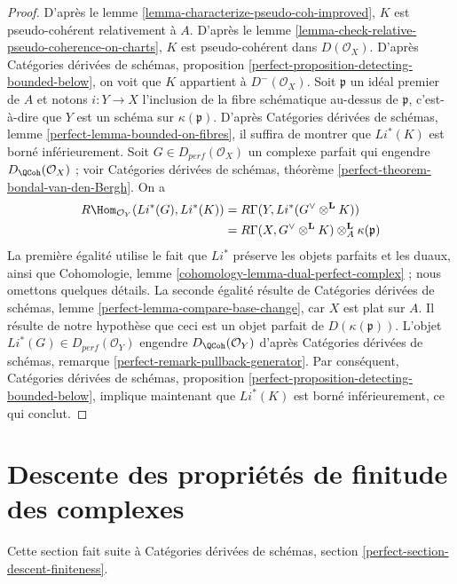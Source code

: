 \begin{proof}
D'après le lemme \ref{lemma-characterize-pseudo-coh-improved},
$K$ est pseudo-cohérent relativement à $A$. D'après le lemme
\ref{lemma-check-relative-pseudo-coherence-on-charts},
$K$ est pseudo-cohérent dans $D( \mathcal{O}_X)$.
D'après Catégories dérivées de schémas, proposition
\ref{perfect-proposition-detecting-bounded-below},
on voit que $K$ appartient à $D^-(\mathcal{O}_X)$.
Soit $\mathfrak{p}$ un idéal premier de $A$ et notons
$i : Y \to X$ l'inclusion de la fibre schématique
au-dessus de $\mathfrak{p}$, c'est-à-dire que $Y$ est un schéma sur $\kappa(\mathfrak p)$.
D'après Catégories dérivées de schémas, lemme \ref{perfect-lemma-bounded-on-fibres},
il suffira de montrer que $Li^*(K)$ est borné inférieurement.
Soit $G \in D_{perf} (\mathcal{O}_X)$ un complexe parfait
qui engendre $D_\QCoh (\mathcal{O}_X)$ ;
voir Catégories dérivées de schémas, théorème
\ref{perfect-theorem-bondal-van-den-Bergh}.
On a
\begin{align*}
R\Hom _{\mathcal{O}_Y}(Li^*(G), Li^*(K))
& =
R\Gamma(Y, Li^*(G ^\vee \otimes ^\mathbf{L} K)) \\
& =
R\Gamma(X, G^\vee \otimes ^{\mathbf{L}} K)
\otimes^\mathbf{L}_A \kappa(\mathfrak{p})
\end{align*}
La première égalité utilise le fait que $Li^*$ préserve les objets parfaits et les duaux,
ainsi que Cohomologie, lemme \ref{cohomology-lemma-dual-perfect-complex} ; nous omettons
quelques détails. La seconde égalité résulte de
Catégories dérivées de schémas, lemme
\ref{perfect-lemma-compare-base-change},
car $X$ est plat sur $A$. Il résulte de notre hypothèse que ceci est un
objet parfait de $D(\kappa(\mathfrak{p}))$. L'objet
$Li^*(G) \in D_{perf}(\mathcal{O}_Y)$ engendre $D_\QCoh(\mathcal{O}_Y)$ d'après
Catégories dérivées de schémas, remarque \ref{perfect-remark-pullback-generator}.
Par conséquent, Catégories dérivées de schémas, proposition
\ref{perfect-proposition-detecting-bounded-below},
implique maintenant que $Li^*(K)$ est borné inférieurement, ce qui conclut.
\end{proof}




\section{Descente des propriétés de finitude des complexes}
\label{section-descent-finiteness}

\noindent
Cette section fait suite à Catégories dérivées de schémas,
section \ref{perfect-section-descent-finiteness}.

